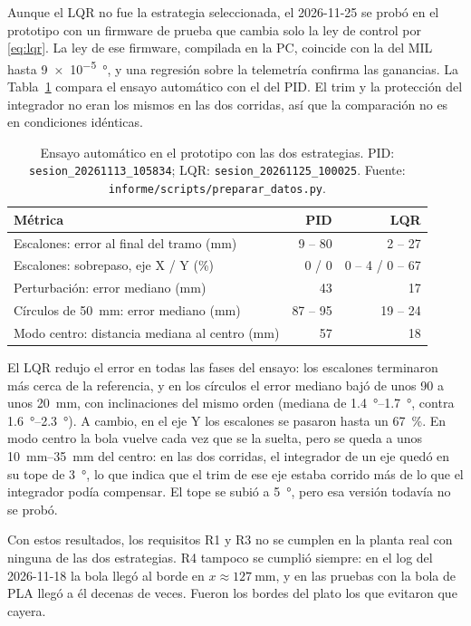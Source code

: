 Aunque el LQR no fue la estrategia seleccionada, el 2026-11-25 se probó en el prototipo con un
firmware de prueba que cambia solo la ley de control por \eqref{eq:lqr}. La ley de ese firmware,
compilada en la PC, coincide con la del MIL hasta \SI{9e-5}{\degree}, y una regresión sobre la
telemetría confirma las ganancias. La Tabla~\ref{tab:exp_lqr} compara el ensayo automático con el
del PID. El trim y la protección del integrador no eran los mismos en las dos corridas, así que la
comparación no es en condiciones idénticas.

\begin{table}[!t]
\caption{Ensayo automático en el prototipo con las dos estrategias. PID:
\texttt{sesion\_20261113\_105834}; LQR: \texttt{sesion\_20261125\_100025}. Fuente:
\texttt{informe/scripts/preparar\_datos.py}.}
\label{tab:exp_lqr}
\centering
\footnotesize
\setlength{\tabcolsep}{3pt}
\begin{tabular}{@{}lrr@{}}
\toprule
\textbf{Métrica} & \textbf{PID} & \textbf{LQR} \\
\midrule
Escalones: error al final del tramo (\si{\milli\metre}) & 9 -- 80 & 2 -- 27 \\
Escalones: sobrepaso, eje X / Y (\si{\percent}) & 0 / 0 & 0 -- 4 / 0 -- 67 \\
Perturbación: error mediano (\si{\milli\metre}) & 43 & 17 \\
Círculos de \SI{50}{\milli\metre}: error mediano (\si{\milli\metre}) & 87 -- 95 & 19 -- 24 \\
Modo centro: distancia mediana al centro (\si{\milli\metre}) & 57 & 18 \\
\bottomrule
\end{tabular}
\end{table}

El LQR redujo el error en todas las fases del ensayo: los escalones terminaron más cerca de la
referencia, y en los círculos el error mediano bajó de unos \SI{90}{} a unos
\SI{20}{\milli\metre}, con inclinaciones del mismo orden (mediana de \SIrange{1.4}{1.7}{\degree},
contra \SIrange{1.6}{2.3}{\degree}). A cambio, en el eje Y los escalones se pasaron hasta un
\SI{67}{\percent}. En modo centro la bola vuelve cada vez que se la suelta, pero se queda a unos
\SIrange{10}{35}{\milli\metre} del centro: en las dos corridas, el integrador de un eje quedó en su
tope de \SI{3}{\degree}, lo que indica que el trim de ese eje estaba corrido más de lo que el
integrador podía compensar. El tope se subió a \SI{5}{\degree}, pero esa versión todavía no se
probó.

Con estos resultados, los requisitos R1 y R3 no se cumplen en la planta real con ninguna de las
dos estrategias. R4 tampoco se
cumplió siempre: en el log del 2026-11-18 la bola llegó al borde en $x \approx \SI{127}{\milli\metre}$,
y en las pruebas con la bola de PLA llegó a él decenas de veces. Fueron los bordes del plato los
que evitaron que cayera.

